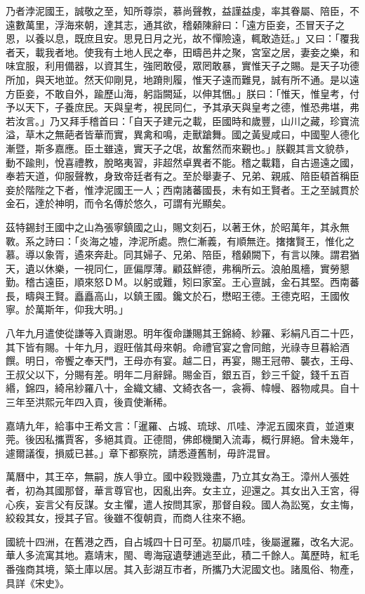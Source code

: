 \begin{pinyinscope}
乃者浡泥國王，誠敬之至，知所尊崇，慕尚聲教，益謹益虔，率其眷屬、陪臣，不遠數萬里，浮海來朝，達其志，通其欲，稽顙陳辭曰：「遠方臣妾，丕冒天子之恩，以養以息，既庶且安。思見日月之光，故不憚險遠，輒敢造廷。」又曰：「覆我者天，載我者地。使我有土地人民之奉，田疇邑井之聚，宮室之居，妻妾之樂，和味宜服，利用備器，以資其生，強罔敢侵，眾罔敢暴，實惟天子之賜。是天子功德所加，與天地並。然天仰剛見，地蹐則履，惟天子遠而難見，誠有所不通。是以遠方臣妾，不敢自外，踰歷山海，躬詣闕延，以伸其悃。」朕曰：「惟天，惟皇考，付予以天下，子養庶民。天與皇考，視民同仁，予其承天與皇考之德，惟恐弗堪，弗若汝言。」乃又拜手稽首曰：「自天子建元之載，臣國時和歲豐，山川之藏，珍寶流溢，草木之無葩者皆華而實，異禽和鳴，走獸蹌舞。國之黃叟咸曰，中國聖人德化漸暨，斯多嘉應。臣土雖遠，實天子之氓，故奮然而來覲也。」朕觀其言文貌恭，動不踰則，悅喜禮教，脫略夷習，非超然卓異者不能。稽之載籍，自古逷遠之國，奉若天道，仰服聲教，身致帝廷者有之。至於舉妻子、兄弟、親戚、陪臣頓首稱臣妾於階陛之下者，惟浡泥國王一人；西南諸蕃國長，未有如王賢者。王之至誠貫於金石，達於神明，而令名傳於悠久，可謂有光顯矣。

茲特錫封王國中之山為張寧鎮國之山，賜文刻石，以著王休，於昭萬年，其永無斁。系之詩曰：「炎海之墟，浡泥所處。煦仁漸義，有順無迕。撦撦賢王，惟化之慕。導以象胥，遹來奔赴。同其婦子、兄弟、陪臣，稽顙闕下，有言以陳。謂君猶天，遺以休樂，一視同仁，匪偏厚薄。顧茲鮮德，弗稱所云。浪舶風檣，實勞懇勤。稽古遠臣，順來怒ＤＭ。以躬或難，矧曰家室。王心亶誠，金石其堅。西南蕃長，疇與王賢。矗矗高山，以鎮王國。鑱文於石，懋昭王德。王德克昭，王國攸寧。於萬斯年，仰我大明。」

八年九月遣使從謙等入貢謝恩。明年復命謙賜其王錦綺、紗羅、彩絹凡百二十匹，其下皆有賜。十年九月，遐旺偕其母來朝。命禮官宴之會同館，光祿寺旦暮給酒饌。明日，帝饗之奉天門，王母亦有宴。越二日，再宴，賜王冠帶、襲衣，王母、王叔父以下，分賜有差。明年二月辭歸。賜金百，銀五百，鈔三千錠，錢千五百緡，錦四，綺帛紗羅八十，金織文繡、文綺衣各一，衾褥、幃幔、器物咸具。自十三年至洪熙元年四入貢，後貢使漸稀。

嘉靖九年，給事中王希文言：「暹羅、占城、琉球、爪哇、浡泥五國來貢，並道東莞。後因私攜賈客，多絕其貢。正德間，佛郎機闌入流毒，概行屏絕。曾未幾年，遽爾議復，損威已甚。」章下都察院，請悉遵舊制，毋許混冒。

萬曆中，其王卒，無嗣，族人爭立。國中殺戮幾盡，乃立其女為王。漳州人張姓者，初為其國那督，華言尊官也，因亂出奔。女主立，迎還之。其女出入王宮，得心疾，妄言父有反謀。女主懼，遣人按問其家，那督自殺。國人為訟冤，女主悔，絞殺其女，授其子官。後雖不復朝貢，而商人往來不絕。

國統十四洲，在舊港之西，自占城四十日可至。初屬爪哇，後屬暹羅，改名大泥。華人多流寓其地。嘉靖末，閩、粵海寇遺孽逋逃至此，積二千餘人。萬歷時，紅毛番強商其境，築土庫以居。其入彭湖互市者，所攜乃大泥國文也。諸風俗、物產，具詳《宋史》。


\end{pinyinscope}
